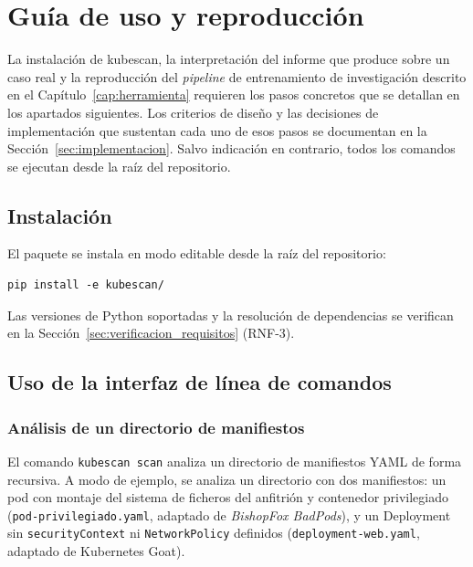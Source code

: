 \chapter{Guía de uso y reproducción}
\label{ap:guia_uso}

La instalación de kubescan, la interpretación del informe que produce
sobre un caso real y la reproducción del \textit{pipeline} de entrenamiento de
investigación descrito en el Capítulo~\ref{cap:herramienta} requieren los pasos
concretos que se detallan en los apartados siguientes. Los criterios de diseño
y las decisiones de implementación que sustentan cada uno de esos pasos se
documentan en la Sección~\ref{sec:implementacion}. Salvo indicación en
contrario, todos los comandos se ejecutan desde la raíz del repositorio.

\section{Instalación}

El paquete se instala en modo editable desde la raíz del repositorio:

{\footnotesize\begin{verbatim}
pip install -e kubescan/
\end{verbatim}}

Las versiones de Python soportadas y la resolución de dependencias se verifican
en la Sección~\ref{sec:verificacion_requisitos} (RNF-3).

\section{Uso de la interfaz de línea de comandos}

\subsection{Análisis de un directorio de manifiestos}

El comando \texttt{kubescan scan} analiza un directorio de manifiestos \acs{YAML}
de forma recursiva. A modo de ejemplo, se analiza un directorio con dos
manifiestos: un pod con montaje del sistema de ficheros del anfitrión
y contenedor privilegiado (\texttt{pod-privilegiado.yaml}, adaptado de
\textit{BishopFox BadPods}), y un Deployment sin
\texttt{securityContext} ni \texttt{NetworkPolicy} definidos
(\texttt{deployment-web.yaml}, adaptado de Kubernetes Goat).

